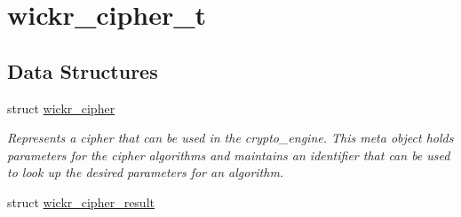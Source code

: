 \hypertarget{group__wickr__cipher}{}\section{wickr\+\_\+cipher\+\_\+t}
\label{group__wickr__cipher}
\subsection*{Data Structures}
\begin{DoxyCompactItemize}
\item 
struct \hyperlink{structwickr__cipher}{wickr\+\_\+cipher}
\begin{DoxyCompactList}\small\item\em Represents a cipher that can be used in the crypto\+\_\+engine. This meta object holds parameters for the cipher algorithms and maintains an identifier that can be used to look up the desired parameters for an algorithm. \end{DoxyCompactList}\item 
struct \hyperlink{structwickr__cipher__result}{wickr\+\_\+cipher\+\_\+result}
\end{DoxyCompactItemize}
